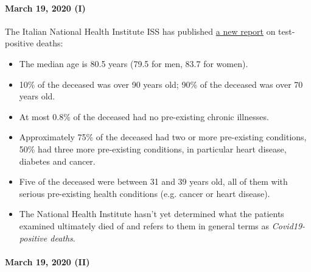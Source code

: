 \hypertarget{march-19-2020-i}{%
\paragraph{March 19, 2020 (I)}\label{march-19-2020-i}}

The Italian National Health Institute ISS has published
\href{https://www.epicentro.iss.it/coronavirus/bollettino/Report-COVID-2019_17_marzo-v2.pdf}{a
new report} on test-positive deaths:

\begin{itemize}
\tightlist
\item
  The median age is 80.5 years (79.5 for men, 83.7 for women).
\item
  10\% of the deceased was over 90 years old; 90\% of the deceased was
  over 70 years old.
\item
  At most 0.8\% of the deceased had no pre-existing chronic illnesses.
\item
  Approximately 75\% of the deceased had two or more pre-existing
  conditions, 50\% had three more pre-existing conditions, in particular
  heart disease, diabetes and cancer.
\item
  Five of the deceased were between 31 and 39 years old, all of them
  with serious pre-existing health conditions (e.g. cancer or heart
  disease).
\item
  The National Health Institute hasn't yet determined what the patients
  examined ultimately died of and refers to them in general terms as
  \emph{Covid19-positive deaths}.
\end{itemize}

\hypertarget{march-19-2020-ii}{%
\paragraph{March 19, 2020 (II)}\label{march-19-2020-ii}}

